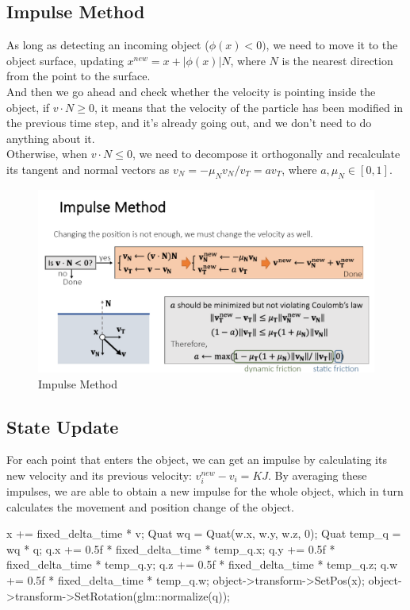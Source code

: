 \documentclass[acmtog]{acmart}
\begin{document}
\subsection{Impulse Method}
As long as detecting an incoming object ($\phi(x)<0)$, we need to move it to the object surface, updating $x^{new}=x+|\phi(x)|N$, where $N$ is the nearest direction from the point to the surface.\\
And then we go ahead and check whether the velocity is pointing inside the object, if $v\cdot N \geq0$, it means that the velocity of the particle has been modified in the previous time step, and it's already going out, and we don't need to do anything about it.\\
Otherwise, when $v\cdot N \leq 0$, we need to decompose it orthogonally and recalculate its tangent and normal vectors as $v_N=-\mu_Nv_N/v_T=av_T$, where $a,\mu_N \in[0,1]$.
\begin{figure}[htb]
	\includegraphics[width=\linewidth]{Impulse Method.png}
	\caption{Impulse Method}
\end{figure}
\subsection{State Update}
For each point that enters the object, we can get an impulse by calculating its new velocity and its previous velocity: $v_i^{new}-v_i=KJ$. By averaging these impulses, we are able to obtain a new impulse for the whole object, which in turn calculates the movement and position change of the object.
\begin{cpp}

x += fixed_delta_time * v;
Quat wq = Quat(w.x, w.y, w.z, 0);
Quat temp_q = wq * q;
q.x += 0.5f * fixed_delta_time * temp_q.x;
q.y += 0.5f * fixed_delta_time * temp_q.y;
q.z += 0.5f * fixed_delta_time * temp_q.z;
q.w += 0.5f * fixed_delta_time * temp_q.w;
object->transform->SetPos(x);
object->transform->SetRotation(glm::normalize(q));
\end{cpp}
\end{document}
